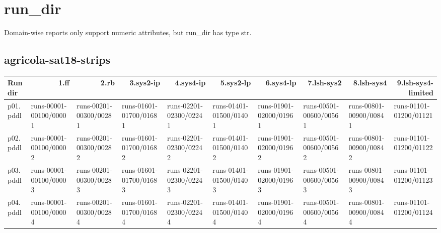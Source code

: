 \documentclass{article}
\begin{document}
\hypertarget{run_dir}{}
\section*{run\_dir}

Domain-wise reports only support numeric attributes, but run\_dir has type str.

\hypertarget{run_dir-agricola-sat18-strips}{}
\subsection*{agricola-sat18-strips}

\begin{tabular}{@{}lrrrrrrrrr@{}}
Run dir & 1.ff & 2.rb & 3.sys2-ip & 4.sys4-ip & 5.sys2-lp & 6.sys4-lp & 7.lsh-sys2 & 8.lsh-sys4 & 9.lsh-sys4-limited \\
\midrule
p01.pddl & \multicolumn{1}{|l|}{runs-00001-00100/00001} & \multicolumn{1}{|l|}{runs-00201-00300/00281} & \multicolumn{1}{|l|}{runs-01601-01700/01681} & \multicolumn{1}{|l|}{runs-02201-02300/02241} & \multicolumn{1}{|l|}{runs-01401-01500/01401} & \multicolumn{1}{|l|}{runs-01901-02000/01961} & \multicolumn{1}{|l|}{runs-00501-00600/00561} & \multicolumn{1}{|l|}{runs-00801-00900/00841} & \multicolumn{1}{|l|}{runs-01101-01200/01121} \\
p02.pddl & \multicolumn{1}{|l|}{runs-00001-00100/00002} & \multicolumn{1}{|l|}{runs-00201-00300/00282} & \multicolumn{1}{|l|}{runs-01601-01700/01682} & \multicolumn{1}{|l|}{runs-02201-02300/02242} & \multicolumn{1}{|l|}{runs-01401-01500/01402} & \multicolumn{1}{|l|}{runs-01901-02000/01962} & \multicolumn{1}{|l|}{runs-00501-00600/00562} & \multicolumn{1}{|l|}{runs-00801-00900/00842} & \multicolumn{1}{|l|}{runs-01101-01200/01122} \\
p03.pddl & \multicolumn{1}{|l|}{runs-00001-00100/00003} & \multicolumn{1}{|l|}{runs-00201-00300/00283} & \multicolumn{1}{|l|}{runs-01601-01700/01683} & \multicolumn{1}{|l|}{runs-02201-02300/02243} & \multicolumn{1}{|l|}{runs-01401-01500/01403} & \multicolumn{1}{|l|}{runs-01901-02000/01963} & \multicolumn{1}{|l|}{runs-00501-00600/00563} & \multicolumn{1}{|l|}{runs-00801-00900/00843} & \multicolumn{1}{|l|}{runs-01101-01200/01123} \\
p04.pddl & \multicolumn{1}{|l|}{runs-00001-00100/00004} & \multicolumn{1}{|l|}{runs-00201-00300/00284} & \multicolumn{1}{|l|}{runs-01601-01700/01684} & \multicolumn{1}{|l|}{runs-02201-02300/02244} & \multicolumn{1}{|l|}{runs-01401-01500/01404} & \multicolumn{1}{|l|}{runs-01901-02000/01964} & \multicolumn{1}{|l|}{runs-00501-00600/00564} & \multicolumn{1}{|l|}{runs-00801-00900/00844} & \multicolumn{1}{|l|}{runs-01101-01200/01124} \\

\end{tabular}
\end{document}
